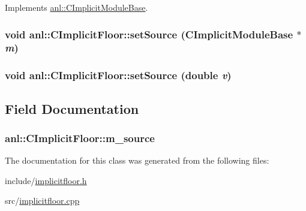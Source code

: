 Implements \hyperlink{classanl_1_1CImplicitModuleBase_ab88f8a1822dcfbc13ba5230318b0acd1}{anl::CImplicitModuleBase}.\hypertarget{classanl_1_1CImplicitFloor_a033bd866e4b67b9cb54a685e1f1f9cf5}{
\subsubsection[{setSource}]{\setlength{\rightskip}{0pt plus 5cm}void anl::CImplicitFloor::setSource ({\bf CImplicitModuleBase} $\ast$ {\em m})}}
\label{classanl_1_1CImplicitFloor_a033bd866e4b67b9cb54a685e1f1f9cf5}
\hypertarget{classanl_1_1CImplicitFloor_a2b85a90fdb4aaa31c2c8b97567ef8d98}{
\subsubsection[{setSource}]{\setlength{\rightskip}{0pt plus 5cm}void anl::CImplicitFloor::setSource (double {\em v})}}
\label{classanl_1_1CImplicitFloor_a2b85a90fdb4aaa31c2c8b97567ef8d98}


\subsection{Field Documentation}
\hypertarget{classanl_1_1CImplicitFloor_aaabb5e0d6aa551a02d73426148cdb66d}{
\subsubsection[{m\_\-source}]{ {\bf anl::CImplicitFloor::m\_\-source}}}
\label{classanl_1_1CImplicitFloor_aaabb5e0d6aa551a02d73426148cdb66d}


The documentation for this class was generated from the following files:\begin{DoxyCompactItemize}
\item 
include/\hyperlink{implicitfloor_8h}{implicitfloor.h}\item 
src/\hyperlink{implicitfloor_8cpp}{implicitfloor.cpp}\end{DoxyCompactItemize}
